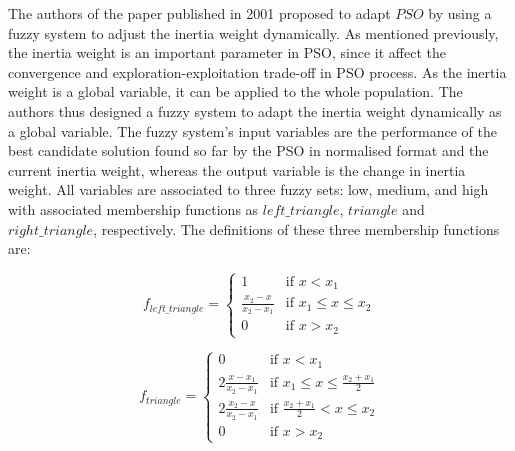The authors of the paper \cite{shi2001fuzzy} published in 2001 proposed to adapt $PSO$ by using a fuzzy system to adjust the inertia weight dynamically. 
As mentioned previously, the inertia weight is an important parameter in PSO, since it affect the convergence and exploration-exploitation trade-off in PSO process. As the inertia weight is a global variable, it can be applied to the whole population. %
The authors thus designed a fuzzy system to adapt the inertia weight dynamically as a global variable. 
The fuzzy system's input variables are the performance of the best candidate solution found so far by the PSO in normalised format and the current inertia weight, whereas the output variable is the change in inertia weight. %
All variables are associated to three fuzzy sets: low, medium, and high with associated membership functions as $left\_triangle$, $triangle$ and $right\_triangle$, respectively. The definitions of these three membership functions are: 

\begin{equation}
    f_{left\_triangle}=
    \begin{cases}
    1 & \text{if $x < x_1$}\\
    \frac{x_2 -x}{x_2 -x_1} & \text{if $x_1 \leq x \leq x_2$}\\
    0 & \text{if $x > x_2$}
    \end{cases}
\end{equation}

\begin{equation}
    f_{triangle}= \begin{cases}
    0 & \text{if $x<x_1$}\\
    2 \frac{x - x_1}{x_2 -x_1} & \text{if $x_1 \leq x \leq \frac{x_2 +x_1}{2}$}\\
    2 \frac{x_2 -x}{x_2 -x_1} & \text{if $\frac{x_2 +x_1}{2} < x \leq x_2$}\\
    0 & \text{if $x > x_2$}
    \end{cases}
\end{equation}

